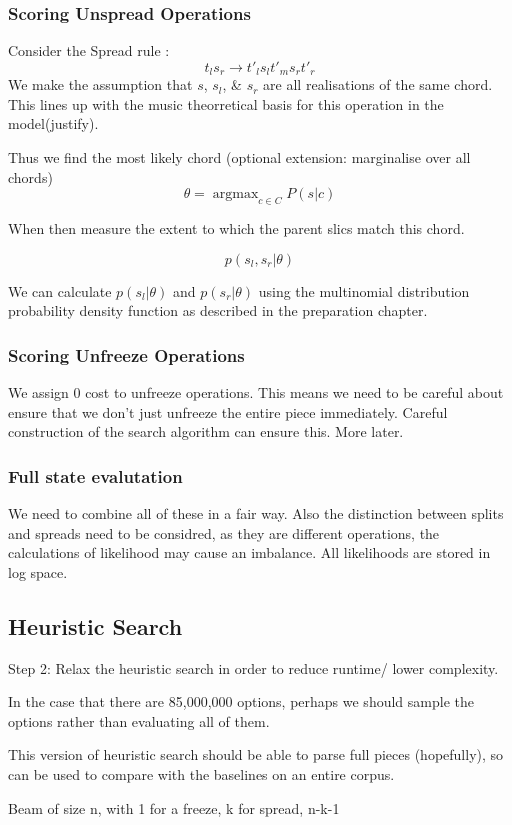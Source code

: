 \documentclass[12pt,a4paper,twoside,openright]{report}
\theoremstyle{definition}
\begin{document}
\FloatBarrier
\subsubsection{Scoring Unspread Operations}

Consider the Spread rule : \[t_l s_r \to t'_l s_l t'_m s_r t'_r\]
We make the assumption that $s$, $s_l$, \& $s_r$ are all realisations of the same chord. This lines up with the music theorretical basis for this operation in the model(justify).
\par 
Thus we find the most likely chord (optional extension: marginalise over all chords)
\[\theta = \mathop{argmax}_{c \in C} P (s|c)\]
\par 
When then measure the extent to which the parent slics match this chord.

\[p(s_l, s_r| \theta)\]

We can calculate $p(s_l|\theta)$ and $p(s_r|\theta)$ using the multinomial distribution probability density function as described in the preparation chapter.

\FloatBarrier
\subsubsection{Scoring Unfreeze Operations}
We assign 0 cost to unfreeze operations. This means we need to be careful about ensure that we don't just unfreeze the entire piece immediately. Careful construction of the search algorithm can ensure this. More later.

\FloatBarrier
\subsubsection{Full state evalutation}
We need to combine all of these in a fair way. Also the distinction between splits and spreads need to be considred, as they are different operations, the calculations of likelihood may cause an imbalance. All likelihoods are stored in log space.

\FloatBarrier
\subsection{Heuristic Search}
Step 2: Relax the heuristic search in order to reduce runtime/ lower complexity.
\par 
In the case that there are 85,000,000 options, perhaps we should sample the options rather than evaluating all of them. 
\par 
This version of heuristic search should be able to parse full pieces (hopefully), so can be used to compare with the baselines on an entire corpus.
\par 
Beam of size n, with 1 for a freeze, k for spread, n-k-1 
\end{document}
